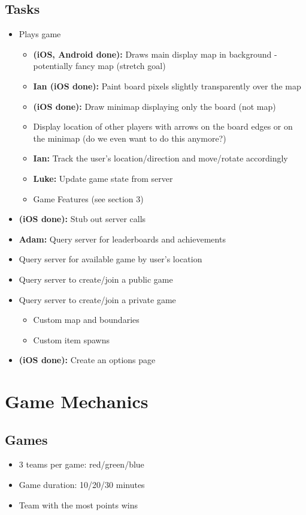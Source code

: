 \documentclass[oneside,12pt]{scrbook}
\begin{document}
\section{Tasks}
\begin{itemize}
    \item Plays game
        \begin{itemize}
            \item \textbf{(iOS, Android done):} Draws main display map in background - potentially fancy map (stretch goal)
            \item \textbf{Ian (iOS done):} Paint board pixels slightly transparently over the map
            \item \textbf{(iOS done):} Draw minimap displaying only the board (not map)
            \item Display location of other players with arrows on the board edges or on the minimap (do we even want to do this anymore?)
            \item \textbf{Ian:} Track the user's location/direction and move/rotate accordingly
            \item \textbf{Luke:} Update game state from server
            \item Game Features (see section 3)
        \end{itemize}
    \item \textbf{(iOS done):} Stub out server calls
    \item \textbf{Adam:} Query server for leaderboards and achievements
    \item Query server for available game by user's location
    \item Query server to create/join a public game
    \item Query server to create/join a private game
        \begin{itemize}
            \item Custom map and boundaries
            \item Custom item spawns
        \end{itemize}
    \item \textbf{(iOS done):} Create an options page
\end{itemize}


\chapter{Game Mechanics}

\section{Games}
\begin{itemize}
    \item 3 teams per game: red/green/blue
    \item Game duration: 10/20/30 minutes
    \item Team with the most points wins
\end{itemize}
\end{document}
